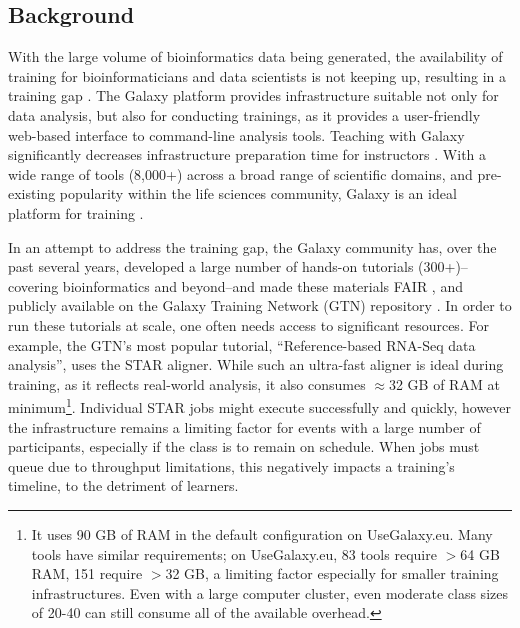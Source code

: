 \subsection*{Background}


With the large volume of bioinformatics data being generated, the availability of training for bioinformaticians and data scientists is not keeping up, resulting in a training gap \cite{Attwood2017}.
The Galaxy platform \cite{afgan2018galaxy} provides infrastructure suitable not only for data analysis, but also for conducting trainings, as it provides a user-friendly web-based interface to command-line analysis tools. Teaching with Galaxy significantly decreases infrastructure preparation time for instructors \cite{gtn2}. With a wide range of tools (8,000+) across a broad range of scientific domains, and pre-existing popularity within the life sciences community, Galaxy is an ideal platform for training \cite{gtn,gtn2}.

In an attempt to address the training gap, the Galaxy community has, over the past several years, developed a large number of hands-on tutorials (300+)--covering bioinformatics and beyond--and made these materials FAIR \cite{Wilkinson2016-zo,10.1371/journal.pcbi.1007854}, and publicly available on the Galaxy Training Network (GTN) repository \cite{training-site}. In order to run these tutorials at scale, one often needs access to significant resources. For example, the GTN's most popular tutorial, ``Reference-based RNA-Seq data analysis'', uses the STAR aligner\cite{Dobin2012}. While such an ultra-fast aligner is ideal during training, as it reflects real-world analysis, it also consumes $\approx$32 GB of RAM at minimum\footnote{It uses 90 GB of RAM in the default configuration on UseGalaxy.eu. Many tools have similar requirements; on UseGalaxy.eu, 83 tools require $>$64 GB RAM, 151 require $>$32 GB, a limiting factor especially for smaller training infrastructures. Even with a large computer cluster, even moderate class sizes of 20-40 can still consume all of the available overhead.}. Individual STAR jobs might execute successfully and quickly, however the infrastructure remains a limiting factor for events with a large number of participants, especially if the class is to remain on schedule. When jobs must queue due to throughput limitations, this negatively impacts a training's timeline, to the detriment of learners.

